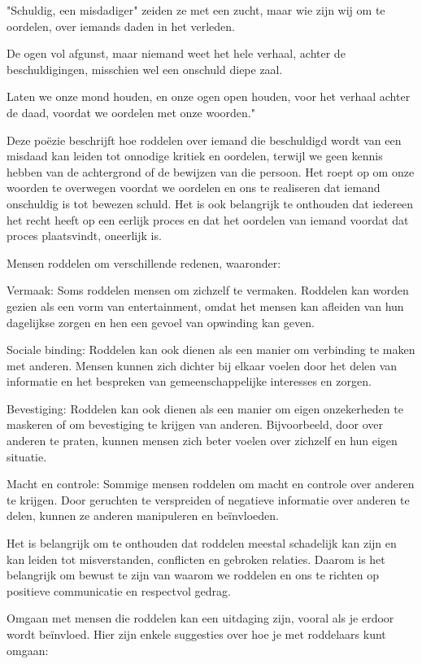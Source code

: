"Schuldig, een misdadiger"
zeiden ze met een zucht,
maar wie zijn wij om te oordelen,
over iemands daden in het verleden.

De ogen vol afgunst,
maar niemand weet het hele verhaal,
achter de beschuldigingen,
misschien wel een onschuld diepe zaal.

Laten we onze mond houden,
en onze ogen open houden,
voor het verhaal achter de daad,
voordat we oordelen met onze woorden."

Deze poëzie beschrijft hoe roddelen over iemand die beschuldigd wordt van een misdaad kan leiden tot onnodige kritiek en oordelen, terwijl we geen kennis hebben van de achtergrond of de bewijzen van die persoon. Het roept op om onze woorden te overwegen voordat we oordelen en ons te realiseren dat iemand onschuldig is tot bewezen schuld. Het is ook belangrijk te onthouden dat iedereen het recht heeft op een eerlijk proces en dat het oordelen van iemand voordat dat proces plaatsvindt, oneerlijk is.

Mensen roddelen om verschillende redenen, waaronder:

Vermaak: Soms roddelen mensen om zichzelf te vermaken. Roddelen kan worden gezien als een vorm van entertainment, omdat het mensen kan afleiden van hun dagelijkse zorgen en hen een gevoel van opwinding kan geven.

Sociale binding: Roddelen kan ook dienen als een manier om verbinding te maken met anderen. Mensen kunnen zich dichter bij elkaar voelen door het delen van informatie en het bespreken van gemeenschappelijke interesses en zorgen.

Bevestiging: Roddelen kan ook dienen als een manier om eigen onzekerheden te maskeren of om bevestiging te krijgen van anderen. Bijvoorbeeld, door over anderen te praten, kunnen mensen zich beter voelen over zichzelf en hun eigen situatie.

Macht en controle: Sommige mensen roddelen om macht en controle over anderen te krijgen. Door geruchten te verspreiden of negatieve informatie over anderen te delen, kunnen ze anderen manipuleren en beïnvloeden.

Het is belangrijk om te onthouden dat roddelen meestal schadelijk kan zijn en kan leiden tot misverstanden, conflicten en gebroken relaties. Daarom is het belangrijk om bewust te zijn van waarom we roddelen en ons te richten op positieve communicatie en respectvol gedrag.

Omgaan met mensen die roddelen kan een uitdaging zijn, vooral als je erdoor wordt beïnvloed. Hier zijn enkele suggesties over hoe je met roddelaars kunt omgaan:

